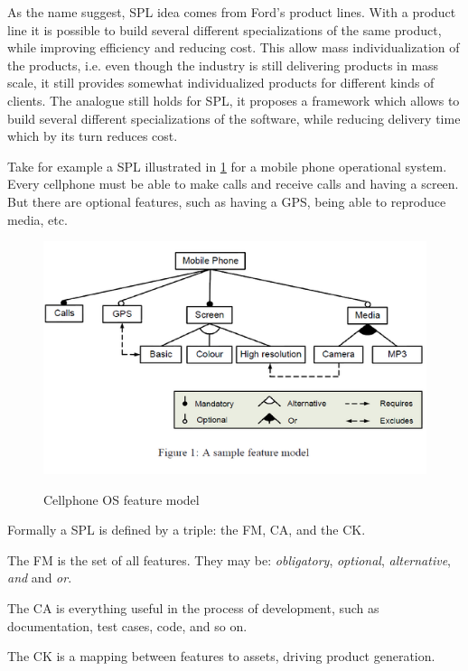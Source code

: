 As the name suggest, \gls{SPL} idea comes from Ford's product lines. With a product line
it is possible to build several different specializations of the same product, while
improving efficiency and reducing cost. This allow mass individualization of the products, i.e. even though the industry is still delivering products in mass scale,
it still provides somewhat individualized products for different kinds of clients.
The analogue still holds for \gls{SPL}, it proposes a framework which allows to build
several different specializations of the software, 
while reducing delivery time which by its turn reduces cost.

Take for example a \gls{SPL} illustrated in \ref{fig:cellphone-fm} for a mobile phone operational system. 
Every cellphone must be able to make calls and receive calls and having a screen. 
But there are optional features, such as having a GPS, being able to reproduce media,
etc.

\begin{figure}
    \centering
    \includegraphics[scale=0.7]{doc/images/mobile-spl}
    \label{fig:cellphone-fm}
    \caption{Cellphone OS feature model} 
\end{figure} 

Formally a \gls{SPL} is defined by a triple: the \gls{FM}, \gls{CA},
and the \gls{CK}.

The \gls{FM} is the set of all features. They may be: \emph{obligatory}, \emph{optional}, \emph{alternative}, \emph{and} and \emph{or}.

The \gls{CA} is everything useful in the process of development, such as documentation, test cases, code, and so on.

The \gls{CK} is a mapping between features to assets, driving product generation.

